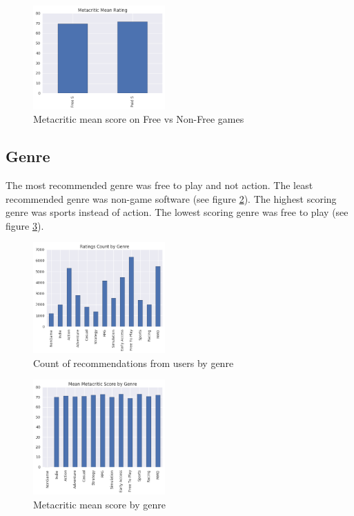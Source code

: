 \documentclass[letterpaper,10pt,twocolumn]{article}
\begin{document}
\begin{figure}[H]
    \label{fig:freevnon-metacritic}
    \caption{Metacritic mean score on Free vs Non-Free games}
    \includegraphics[width=0.45\textwidth,keepaspectratio]{freevnon-metacritic-bar}
\end{figure}


\subsection{Genre}

The most recommended genre was free to play and not action. The least
recommended genre was non-game software (see figure \ref{fig:genre-ratings}).
The highest scoring genre was sports instead of action. The lowest
scoring genre was free to play (see figure \ref{fig:genre-metacritic}).

\begin{figure}[H]
    \label{fig:genre-ratings}
    \caption{Count of recommendations from users by genre}
    \includegraphics[width=0.45\textwidth,keepaspectratio]{genre-ratings-bar}
\end{figure}

\begin{figure}[H]
    \label{fig:genre-metacritic}
    \caption{Metacritic mean score by genre}
    \includegraphics[width=0.45\textwidth,keepaspectratio]{genre-metacritic-bar}
\end{figure}
\end{document}

